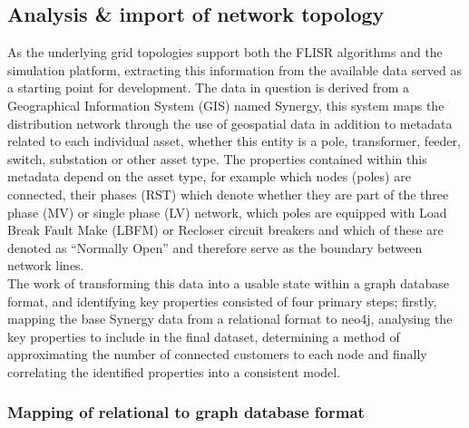 
\subsection{Analysis \& import of network topology}
\label{sec:import}

\noindent As the underlying grid topologies support both the FLISR algorithms and the simulation platform, extracting this information from the available data served as a starting point for development.
The data in question is derived from a Geographical Information System (GIS) named Synergy, this system maps the distribution
network through the use of geospatial data \cite{4662926} in addition to metadata related to each individual asset, whether this entity is a pole, transformer, feeder, switch, substation
or other asset type. The properties contained within this metadata depend on the asset type, for example which nodes (poles) are connected, their phases (RST) which denote
whether they are part of the three phase (MV) or single phase (LV) network, which poles are equipped with Load Break Fault Make (LBFM) or Recloser circuit breakers and which of these
are denoted as ``Normally Open'' and therefore serve as the boundary between network lines.
\\
The work of transforming this data into a usable state within a graph database format, and identifying key properties consisted of four primary steps; firstly, mapping the base Synergy data from
a relational format to neo4j, analysing the key properties to include in the final dataset, determining a method of approximating the number of connected customers to each node and finally correlating
the identified properties into a consistent model.

\subsubsection{Mapping of relational to graph database format}
\label{sec:mapping}

